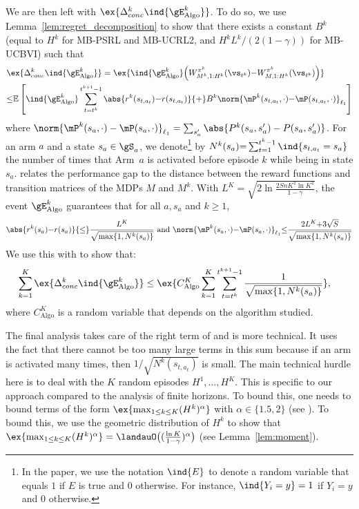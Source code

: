 \begin{subappendices}
We are then left with $\ex{\Delta_{conc}^k \ind{\gE^{k}_\text{Algo}}}$. To do so, we use Lemma~\ref{lem:regret_decomposition} to show that there exists a constant $B^k$ (equal to $H^k$ for MB-PSRL and MB-UCRL2, and $H^kL^{k}/(2(1-\gamma))$ for MB-UCBVI) such that 
\begin{align}
    &\ex{\Delta_{conc}^k\ind{\gE^{k}_\text{Algo}}}=\ex{\ind{\gE^{k}_\text{Algo}} \Big(W_{M^k,1:H^k}^{\pi^k}(\vs_{t^k}){-}W_{M,1:H^k}^{\pi^k}(\vs_{t^k})\Big)} \nonumber\\
    & {\le} \mathbb{E}\left[\ind{\gE^{k}_\text{Algo}} \sum_{t=t^k}^{t^{k+1}{-}1}\abs{r^k(s_{t,a_t}){-}r(s_{t,a_t})}{+}B^k\norm{\mP^{k}(s_{t,a_t},\cdot){-}\mP(s_{t,a_t},\cdot)}_{\ell_1}\right] \label{eq:proof2}
\end{align}
where ${\norm{\mP^{k}(s_a,\cdot)-\mP(s_a,\cdot)}_{\ell_1}=\sum_{s'_a}\abs{P^{k}(s_a,s'_a)-P(s_a,s'_a)}}$. 
For an arm $a$ and a state $s_a\in\gS_a$, we denote\footnote{In the paper, we use the notation $\ind{E}$ to denote a random variable that equals $1$ if $E$ is true and $0$ otherwise. For instance, $\ind{Y_i=y}=1$ if $Y_i=y$ and $0$ otherwise.} by $N^{k}(s_a){=} \sum_{t=1}^{t^{k}-1} \ind{s_{t,a_t}=s_a}$ the number of times that Arm~$a$ is activated before episode $k$ while being in state $s_a$.  relates the performance gap to the distance between the reward functions and transition matrices of the MDPs $M$ and $M^k$. 
With $L^K{=}\sqrt{2\ln\frac{2SnK^2\ln K^2}{1-\gamma}}$, the event $\gE^{k}_\text{Algo}$ guarantees that for all $a, s_a$ and $ k\ge1$, 
\begin{align}
    \label{eq:concentration}
    \abs{r^k(s_a){-}r(s_a)} {\le} \frac{L^K}{\sqrt{\max\{1,N^{k}(s_a)\}}} \text{ and }
    \norm{\mP^{k}(s_a,\cdot){-}\mP(s_a,\cdot)}_{\ell_1} {\le} \frac{2L^K {+}3\sqrt{S}}{\sqrt{\max\{1,N^{k}(s_a)\}}}
\end{align}
We use this with  to show that:
\begin{align}
    \label{eq:proof3}
    \sum_{k=1}^K\ex{\Delta_{conc}^k \ind{\gE_\text{Algo}^{k}}} &\le  \ex{C_\text{Algo}^K\sum_{k=1}^K\sum_{t=t^k}^{t^{k+1}-1}\frac{1}{\sqrt{\max\{1,N^{k}(s_a)\}}}},
\end{align}
where $C_\text{Algo}^K$ is a random variable that depends on the algorithm studied. 

The final analysis takes care of the right term of  and is more technical. It uses the fact that there cannot be too many large terms in this sum because if an arm is activated many times, then $1/\sqrt{N^{k}(s_{t,a_t})}$ is small. 
The main technical hurdle here is to deal with the $K$ random episodes $H^1,\ldots, H^K$. 
This is specific to our approach compared to the analysis of finite horizons. 
To bound this, one needs to bound terms of the form $\ex{\max_{1\leq k\leq K} (H^k)^\alpha}$ with $\alpha\in\{1.5,2\}$ (see ). 
To bound this, we use the geometric distribution of $H^k$ to show that $\ex{\max_{1\leq k\leq K} (H^k)^{\alpha}}=\landauO\bigl((\frac{\ln K}{1-\gamma})^{\alpha}\bigr)$ (see Lemma~\ref{lem:moment}).


\end{subappendices}

